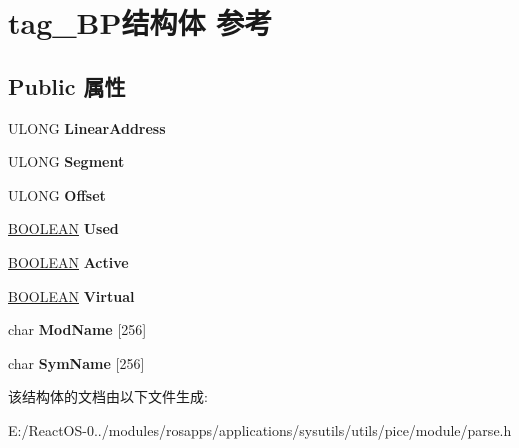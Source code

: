 \hypertarget{structtag___b_p}{}\section{tag\+\_\+\+B\+P结构体 参考}
\label{structtag___b_p}
\subsection*{Public 属性}
\begin{DoxyCompactItemize}
\item 
\mbox{\label{structtag___b_p_a2507683a32e0bdf6d1fef6cb46f5d0b9}} 
U\+L\+O\+NG {\bfseries Linear\+Address}
\item 
\mbox{\label{structtag___b_p_a285c62d2ba1a2d98220ba8d3fe12579b}} 
U\+L\+O\+NG {\bfseries Segment}
\item 
\mbox{\label{structtag___b_p_ad20af3e20df806aa57049e7162895ab7}} 
U\+L\+O\+NG {\bfseries Offset}
\item 
\mbox{\label{structtag___b_p_a0624b4f7d9244da8c26c8a2b0de82559}} 
\hyperlink{_processor_bind_8h_a112e3146cb38b6ee95e64d85842e380a}{B\+O\+O\+L\+E\+AN} {\bfseries Used}
\item 
\mbox{\label{structtag___b_p_a2d4fa9dc8e7b6e91a8056302fa195f4e}} 
\hyperlink{_processor_bind_8h_a112e3146cb38b6ee95e64d85842e380a}{B\+O\+O\+L\+E\+AN} {\bfseries Active}
\item 
\mbox{\label{structtag___b_p_a57537e34004e999eb382f86be7652605}} 
\hyperlink{_processor_bind_8h_a112e3146cb38b6ee95e64d85842e380a}{B\+O\+O\+L\+E\+AN} {\bfseries Virtual}
\item 
\mbox{\label{structtag___b_p_a5fcefe353eab528e3f0998846d5f6425}} 
char {\bfseries Mod\+Name} \mbox{[}256\mbox{]}
\item 
\mbox{\label{structtag___b_p_abeec8d532b73400d2cfad98cd5cf6374}} 
char {\bfseries Sym\+Name} \mbox{[}256\mbox{]}
\end{DoxyCompactItemize}


该结构体的文档由以下文件生成\+:\begin{DoxyCompactItemize}
\item 
E\+:/\+React\+O\+S-\/0../modules/rosapps/applications/sysutils/utils/pice/module/parse.\+h\end{DoxyCompactItemize}
